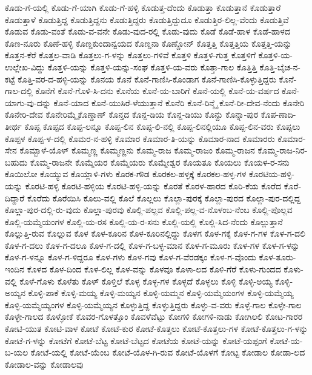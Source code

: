 ಕೊಡು-ಗೆ-ಯಲ್ಲಿ
ಕೊಡು-ಗೆ-ಯಾಗಿ
ಕೊಡು-ಗೆ-ಹಳ್ಳಿ
ಕೊಡುತ್ತ-ದೆಂದು
ಕೊಡುತ್ತಾ
ಕೊಡುತ್ತಾನೆ
ಕೊಡುತ್ತಾರೆ
ಕೊಡುತ್ತಾಳೆ
ಕೊಡುತ್ತಿದ್ದ
ಕೊಡುತ್ತಿದ್ದನು
ಕೊಡುತ್ತಿದ್ದರು
ಕೊಡುತ್ತಿದ್ದುದೂ
ಕೊಡುತ್ತಿರ-ಲಿಲ್ಲ-ವೆಂದು
ಕೊಡುತ್ತಿವೆ
ಕೊಡುವ
ಕೊಡು-ವಂತೆ
ಕೊಡು-ವ-ವನೇ
ಕೊಡು-ವುದ-ರಲ್ಲಿ
ಕೊಡು-ವುದು
ಕೊಡೆ
ಕೊಡೆ-ಹಾಳ
ಕೊಡೆ-ಹಾಳದ
ಕೊಣ-ನೂರು
ಕೊಣೆ-ಹಳ್ಳಿ
ಕೊಣ್ಡಕುಂದಾನ್ವಯದ
ಕೊಣ್ಡನಾ
ಕೊಣ್ಡೋನ್
ಕೊತ್ತತ್ತಿ
ಕೊತ್ತತ್ತಿಯ
ಕೊತ್ತತ್ತಿ-ಯನ್ನು
ಕೊತ್ತನ-ಕೆರೆ
ಕೊತ್ತಲ-ವಾಡಿ
ಕೊತ್ತಲು-ಗ-ಳನ್ನು
ಕೊತ್ತಲು-ಗಳಿವೆ
ಕೊತ್ತಳಿ
ಕೊತ್ತಳಿ-ಗುತ್ತ
ಕೊತ್ತಳಿಗೆ
ಕೊತ್ತಳಿ-ಯ-ಉಲ್ಲೇಖ-ವಿದ್ದು
ಕೊತ್ತಳಿ-ಯನ್ನು
ಕೊತ್ತಳಿ-ಯನ್ನು-ಸಂಘ
ಕೊತ್ತಳಿ-ಯ-ವರು
ಕೊತ್ತಾ-ಗಾಲ
ಕೊತ್ತಿತ್ತಿ
ಕೊತ್ತಿ-ಬೈಚ-ನ-ಕಟ್ಟೆ
ಕೊತ್ತಿ-ವರ-ದ-ಹಳ್ಳಿ-ಯನ್ನು
ಕೊನಯ
ಕೊನೆ
ಕೊನೆ-ಗಾಣಿಸಿ-ಕೊಂಡಾಗ
ಕೊನೆ-ಗಾಣಿಸಿ-ಕೊಳ್ಳುತ್ತಿದ್ದರು
ಕೊನೆ-ಗಾಲ-ದಲ್ಲಿ
ಕೊನೆಗೆ
ಕೊನೆ-ಗೊಳಿ-ಸಿ-ದನು
ಕೊನೆಯ
ಕೊನೆ-ಯ-ಬಾರಿಗೆ
ಕೊನೆ-ಯಲ್ಲಿ
ಕೊನೆ-ಯ-ವರ್ಷದ
ಕೊನೆ-ಯಾಗು-ವು-ದನ್ನು
ಕೊನೆ-ಯಾದ
ಕೊನೆ-ಯುಸಿರೆ-ಳೆಯುತ್ತಾನೆ
ಕೊನೆರಿ
ಕೊನೆ-ರಿನ್ಮೈ
ಕೊನೆ-ರೀ-ದೇವ-ನೆಂದು
ಕೊನೇರಿ
ಕೊನೇರಿ-ದೇವ
ಕೊನೇರಿಮ್ಮೈಕೊಣ್ಡಾಣ್
ಕೊನ್ತದ
ಕೊನ್ದ-ಡಿಯ
ಕೊನ್ದ-ಡಿಯು
ಕೊನ್ದು
ಕೊನ್ನಾ-ಪುರ
ಕೊಪ-ಣಾದಿ-ತೀರ್ಥ
ಕೊಪ್ಪ
ಕೊಪ್ಪದ
ಕೊಪ್ಪ-ಲನ್ನೂ
ಕೊಪ್ಪ-ಲಿನ
ಕೊಪ್ಪ-ಲಿ-ನಲ್ಲಿ
ಕೊಪ್ಪ-ಲಿನಲ್ಲಿಯೂ
ಕೊಪ್ಪ-ಲಿನ-ವರು
ಕೊಪ್ಪಲು
ಕೊಪ್ಪಳ
ಕೊಪ್ಪ-ಳ-ದಲ್ಲಿ
ಕೊಮರ-ನ-ಹಳ್ಳಿ
ಕೊಮಾರ
ಕೊಮಾರ-ತಿ-ಯನ್ನು
ಕೊಮಾರ-ನಾದ
ಕೊಮಾರರು
ಕೊಮಾರ-ಸೇನ
ಕೊಮ್ಬಾಳೆ-ಯೊಳ್
ಕೊಮ್ಮಣ್ಣ
ಕೊಮ್ಮಣ್ಣನು
ಕೊಮ್ಮ-ರಾಜ
ಕೊಮ್ಮ-ರಾಜಂ
ಕೊಮ್ಮ-ರಾಜನ
ಕೊಮ್ಮ-ರಾಜ-ನಿರ-ಬಹುದು
ಕೊಮ್ಮ-ರಾಜನೇ
ಕೊಮ್ಮೆಯರ
ಕೊಮ್ಮೆಯರು
ಕೊಮ್ಮೇಶ್ವರ
ಕೊಯತೂ
ಕೊಯಲು
ಕೊಯಳ-ರ-ಸನು
ಕೊಯಿಲೋ
ಕೊಯ್ಯುವ
ಕೊಯ್ಲಾಳಿ-ಗಳು
ಕೊರಕ-ಗೌಡ
ಕೊರಕಲ-ಹಳ್ಳಕ್ಕೆ
ಕೊರಕಲ-ಹಳ್ಳ-ಗಳ
ಕೊರಟಿಯ-ಹಳ್ಳಿ-ಯನ್ನು
ಕೊರಟಿ-ಹಳ್ಳಿ
ಕೊರಟಿ-ಹಳ್ಳಿಯ
ಕೊರಟಿ-ಹಳ್ಳಿ-ಯನ್ನು
ಕೊರತೆ
ಕೊರಳ-ಹಾರದ
ಕೊರಿ-ಕೆಯ
ಕೊರೆದ
ಕೊರೆ-ದಿದ್ದಾರೆ
ಕೊರೆದು
ಕೊರೆಯಿಸಿ
ಕೊಲು-ವಲ್ಲಿ
ಕೊಲೆ
ಕೊಲ್ಲಲು
ಕೊಲ್ಲಾ-ಪುರಕ್ಕೆ
ಕೊಲ್ಲಾ-ಪುರದ
ಕೊಲ್ಲಾ-ಪುರ-ದಲ್ಲಿದ್ದ
ಕೊಲ್ಲಾ-ಪುರ-ದಲ್ಲಿ-ರು-ವುದು
ಕೊಲ್ಲಾ-ಪುರವು
ಕೊಲ್ಲಿ-ಪಲ್ಲವ
ಕೊಲ್ಲಿ-ಪಲ್ಲ-ವ-ನೊಳಂಬ-ನೆಂಬ
ಕೊಲ್ಲಿ-ಪೊಲ್ಲವ
ಕೊಲ್ಲಿ-ಯಮ್ಮೆಯಂಗಳ
ಕೊಲ್ಲಿ-ಯ-ರಸ
ಕೊಲ್ಲಿ-ಯ-ರ-ಸನು
ಕೊಲ್ಲಿ-ಯಲ್ಲಿ
ಕೊಲ್ಲಿ-ಸಿದ-ನೆಂದು
ಕೊಲ್ಲುತ್ತಾನೆ
ಕೊಲ್ಲುತ್ತಿ-ರುವ
ಕೊಲ್ಲುವ
ಕೊಳ
ಕೊಳ-ಕೂರಿನ
ಕೊಳ-ಕೂರಿನಲ್ಲಿದ್ದು
ಕೊಳಗ
ಕೊಳ-ಗಕ್ಕೆ
ಕೊಳ-ಗ-ಗಳ
ಕೊಳ-ಗ-ದಲಿ
ಕೊಳ-ಗ-ದಲು
ಕೊಳ-ಗ-ದಲೂ
ಕೊಳ-ಗ-ದಲ್ಲಿ
ಕೊಳ-ಗ-ಬಳ್ಳ-ಮಾನ
ಕೊಳ-ಗ-ಮೂರು
ಕೊಳ-ಗಳ
ಕೊಳ-ಗ-ಳನ್ನು
ಕೊಳ-ಗ-ಳನ್ನೂ
ಕೊಳ-ಗ-ಳಿದ್ದರೂ
ಕೊಳ-ಗಳು
ಕೊಳ-ಗವು
ಕೊಳ-ಗ-ವೆರಡಕ್ಕಂ
ಕೊಳ-ಗ-ವೊಂದು
ಕೊಳ-ತೂರು-ಇಂದಿನ
ಕೊಳದ
ಕೊಳ-ದಿಂದ
ಕೊಳ-ಲಿಲ್ಲ
ಕೊಳ-ವನ್ನು
ಕೊಳವೂ
ಕೊಳಾ-ಲದ
ಕೊಳಿ-ಗೆರೆ
ಕೊಳು-ಗುಂದದ
ಕೊಳು-ವಲ್ಲಿ
ಕೊಳೆ-ಗೊಳು
ಕೊಳೆತು
ಕೊಳ್
ಕೊಳ್ತಿಲೆ
ಕೊಳ್ಳ
ಕೊಳ್ಳ-ಗಳ
ಕೊಳ್ಳದೆ
ಕೊಳ್ಳಲು
ಕೊಳ್ಳಿ
ಕೊಳ್ಳಿ-ಅಯ್ಯ
ಕೊಳ್ಳಿ-ಅಯ್ಯನ
ಕೊಳ್ಳಿ-ಪಾಕೆ
ಕೊಳ್ಳಿ-ಮಯ್ಯ
ಕೊಳ್ಳಿ-ಮಯ್ಯನ
ಕೊಳ್ಳಿ-ಯಮ್ಮನ
ಕೊಳ್ಳಿ-ಯಮ್ಮೆಯಂಗಳ
ಕೊಳ್ಳಿ-ಯಮ್ಮೆಯ್ಯ
ಕೊಳ್ಳಿ-ಯಮ್ಮೆಯ್ಯಂಗಳ
ಕೊಳ್ಳಿ-ಯಮ್ಮೆಯ್ಯನ
ಕೊಳ್ಳುತ್ತಿದ್ದ
ಕೊಳ್ಳುತ್ತಿದ್ದರು
ಕೊಳ್ಳು-ವ-ವರು
ಕೊಳ್ಳೆ-ಗಾಲ
ಕೊಳ್ಳೇ-ಗಾಲ
ಕೊಳ್ಳೇ-ಗಾಲದ
ಕೊಳ್ಳೋಕೆ
ಕೊವರ-ಗೊಳತ್ತೊಂ
ಕೊವಳೆವೆಟ್ಟು
ಕೋಗಳಿ
ಕೋಗಳಿ-ನಾಡು
ಕೋಗಿಲಲಿ
ಕೋಟ-ಗಾರರ
ಕೋಟಿ-ಯುತ
ಕೋಟಿ-ವಾಳ
ಕೋಟೆ
ಕೋಟೆ-ಕುರ
ಕೋಟೆ-ಕೊತ್ತಲು
ಕೋಟೆ-ಕೊತ್ತಲು-ಗಳ
ಕೋಟೆ-ಕೊತ್ತಲು-ಗ-ಳನ್ನು
ಕೋಟೆ-ಗ-ಳನ್ನು
ಕೋಟೆಗೆ
ಕೋಟೆ-ಬೆಟ್ಟ
ಕೋಟೆ-ಬೆಟ್ಟದ
ಕೋಟೆಯ
ಕೋಟೆ-ಯನ್ನು
ಕೋಟೆ-ಯಪ್ಪಂಗೆ
ಕೋಟೆ-ಯ-ಬ-ಯಲ
ಕೋಟೆ-ಯಲ್ಲಿ
ಕೋಟೆ-ಯೆಂಬ
ಕೋಟೆ-ಯೊಳ-ಗಿ-ರುವ
ಕೋಟೆ-ಯೊಳಗೆ
ಕೋಟ್ಟ
ಕೋಡಾಲ
ಕೋಡಾ-ಲದ
ಕೋಡಾಲ-ವನ್ನು
ಕೋಡಾಲವು

